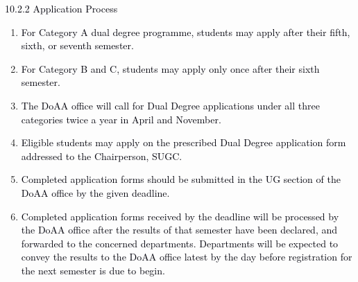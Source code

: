 \documentclass[12pt]{article}
\begin{document}
\vspace{\baselineskip}
{\fontsize{10pt}{12.0pt}\selectfont \textcolor[HTML]{00000A}{10.2.2 Application Process}\par}\par


\vspace{\baselineskip}
\begin{enumerate}
	\item {\fontsize{10pt}{12.0pt}\selectfont \textcolor[HTML]{00000A}{For Category A dual degree programme, students may apply after their fifth, sixth, or seventh semester.}\par}\par


\vspace{\baselineskip}
	\item {\fontsize{10pt}{12.0pt}\selectfont \textcolor[HTML]{00000A}{For Category B and C, students may apply only once after their sixth semester.}\par}\par


\vspace{\baselineskip}
	\item {\fontsize{9pt}{10.8pt}\selectfont \textcolor[HTML]{00000A}{The DoAA office will call for Dual Degree applications under all three categories twice a year in April and November.}\par}\par


\vspace{\baselineskip}
	\item {\fontsize{9pt}{10.8pt}\selectfont \textcolor[HTML]{00000A}{Eligible students may apply on the prescribed Dual Degree application form addressed to the Chairperson, SUGC.}\par}\par


\vspace{\baselineskip}
	\item {\fontsize{10pt}{12.0pt}\selectfont \textcolor[HTML]{00000A}{Completed application forms should be submitted in the UG section of the DoAA office by the given deadline.}\par}\par


\vspace{\baselineskip}
	\item {\fontsize{9pt}{10.8pt}\selectfont \textcolor[HTML]{00000A}{Completed application forms received by the deadline will be processed by the DoAA office after the results of that semester have been declared, and forwarded to the concerned departments. Departments will be expected to convey the results to the DoAA office latest by the day before registration for the next semester is due to begin.}\par}\par



\end{enumerate}
\end{document}
